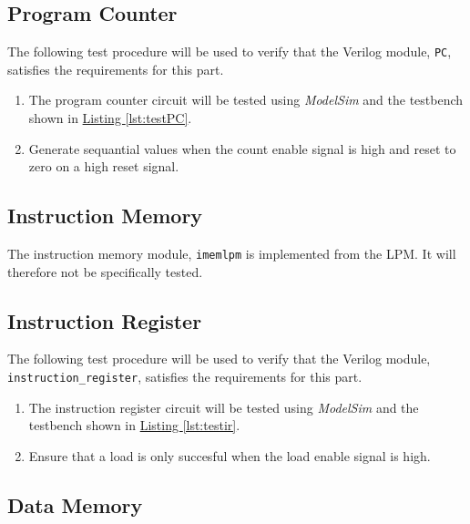 
\subsection{Program Counter} %
\label{sub:program_counter_pro}

The following test procedure will be used to verify that the Verilog module, \verb|PC|, satisfies the requirements for this part.

\begin{enumerate}
    \item The program counter circuit will be tested using \emph{ModelSim} and the testbench shown in \hyperref[lst:testPC]{Listing \ref*{lst:testPC}}.
    \item Generate sequantial values when the count enable signal is high and reset to zero on a high reset signal.
\end{enumerate}


\subsection{Instruction Memory} %
\label{sub:instruction_memory}

The instruction memory module, \verb|imemlpm| is implemented from the LPM.
It will therefore not be specifically tested.


\subsection{Instruction Register} %
\label{sub:instruction_register_pro}

The following test procedure will be used to verify that the Verilog module, \verb|instruction_register|, satisfies the requirements for this part.

\begin{enumerate}
    \item The instruction register circuit will be tested using \emph{ModelSim} and the testbench shown in \hyperref[lst:testir]{Listing \ref*{lst:testir}}.
    \item Ensure that a load is only succesful when the load enable signal is high.
\end{enumerate}


\subsection{Data Memory} %
\label{sub:data_memory}

